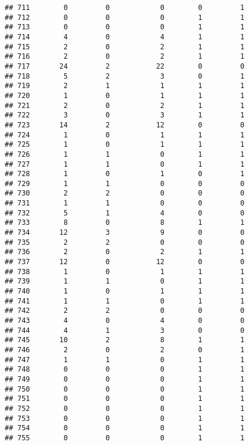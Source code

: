 \documentclass[
]{article}
\begin{document}
\begin{verbatim}
## 711        0         0            0        0         1
## 712        0         0            0        1         1
## 713        0         0            0        1         1
## 714        4         0            4        1         1
## 715        2         0            2        1         1
## 716        2         0            2        1         1
## 717       24         2           22        0         0
## 718        5         2            3        0         1
## 719        2         1            1        1         1
## 720        1         0            1        1         1
## 721        2         0            2        1         1
## 722        3         0            3        1         1
## 723       14         2           12        0         0
## 724        1         0            1        1         1
## 725        1         0            1        1         1
## 726        1         1            0        1         1
## 727        1         1            0        1         1
## 728        1         0            1        0         1
## 729        1         1            0        0         0
## 730        2         2            0        0         0
## 731        1         1            0        0         0
## 732        5         1            4        0         0
## 733        8         0            8        1         1
## 734       12         3            9        0         0
## 735        2         2            0        0         0
## 736        2         0            2        1         1
## 737       12         0           12        0         0
## 738        1         0            1        1         1
## 739        1         1            0        1         1
## 740        1         0            1        1         1
## 741        1         1            0        1         1
## 742        2         2            0        0         0
## 743        4         0            4        0         0
## 744        4         1            3        0         0
## 745       10         2            8        1         1
## 746        2         0            2        0         1
## 747        1         1            0        1         1
## 748        0         0            0        1         1
## 749        0         0            0        1         1
## 750        0         0            0        1         1
## 751        0         0            0        1         1
## 752        0         0            0        1         1
## 753        0         0            0        1         1
## 754        0         0            0        1         1
## 755        0         0            0        1         1

\end{verbatim}
\end{document}
